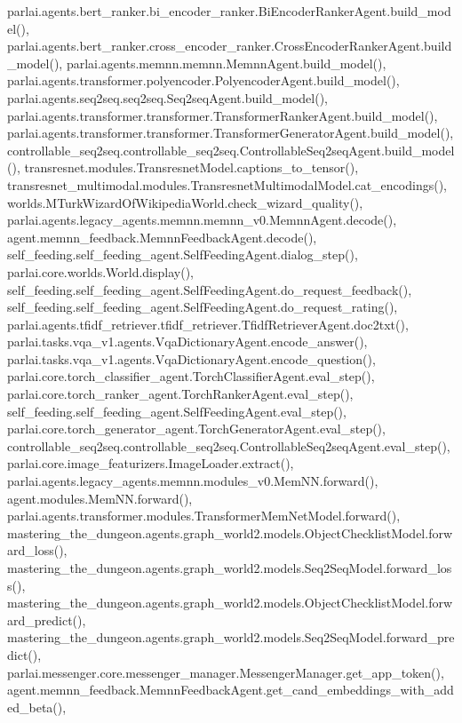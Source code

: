 parlai.\+agents.\+bert\+\_\+ranker.\+bi\+\_\+encoder\+\_\+ranker.\+Bi\+Encoder\+Ranker\+Agent.\+build\+\_\+model(), parlai.\+agents.\+bert\+\_\+ranker.\+cross\+\_\+encoder\+\_\+ranker.\+Cross\+Encoder\+Ranker\+Agent.\+build\+\_\+model(), parlai.\+agents.\+memnn.\+memnn.\+Memnn\+Agent.\+build\+\_\+model(), parlai.\+agents.\+transformer.\+polyencoder.\+Polyencoder\+Agent.\+build\+\_\+model(), parlai.\+agents.\+seq2seq.\+seq2seq.\+Seq2seq\+Agent.\+build\+\_\+model(), parlai.\+agents.\+transformer.\+transformer.\+Transformer\+Ranker\+Agent.\+build\+\_\+model(), parlai.\+agents.\+transformer.\+transformer.\+Transformer\+Generator\+Agent.\+build\+\_\+model(), controllable\+\_\+seq2seq.\+controllable\+\_\+seq2seq.\+Controllable\+Seq2seq\+Agent.\+build\+\_\+model(), transresnet.\+modules.\+Transresnet\+Model.\+captions\+\_\+to\+\_\+tensor(), transresnet\+\_\+multimodal.\+modules.\+Transresnet\+Multimodal\+Model.\+cat\+\_\+encodings(), worlds.\+M\+Turk\+Wizard\+Of\+Wikipedia\+World.\+check\+\_\+wizard\+\_\+quality(), parlai.\+agents.\+legacy\+\_\+agents.\+memnn.\+memnn\+\_\+v0.\+Memnn\+Agent.\+decode(), agent.\+memnn\+\_\+feedback.\+Memnn\+Feedback\+Agent.\+decode(), self\+\_\+feeding.\+self\+\_\+feeding\+\_\+agent.\+Self\+Feeding\+Agent.\+dialog\+\_\+step(), parlai.\+core.\+worlds.\+World.\+display(), self\+\_\+feeding.\+self\+\_\+feeding\+\_\+agent.\+Self\+Feeding\+Agent.\+do\+\_\+request\+\_\+feedback(), self\+\_\+feeding.\+self\+\_\+feeding\+\_\+agent.\+Self\+Feeding\+Agent.\+do\+\_\+request\+\_\+rating(), parlai.\+agents.\+tfidf\+\_\+retriever.\+tfidf\+\_\+retriever.\+Tfidf\+Retriever\+Agent.\+doc2txt(), parlai.\+tasks.\+vqa\+\_\+v1.\+agents.\+Vqa\+Dictionary\+Agent.\+encode\+\_\+answer(), parlai.\+tasks.\+vqa\+\_\+v1.\+agents.\+Vqa\+Dictionary\+Agent.\+encode\+\_\+question(), parlai.\+core.\+torch\+\_\+classifier\+\_\+agent.\+Torch\+Classifier\+Agent.\+eval\+\_\+step(), parlai.\+core.\+torch\+\_\+ranker\+\_\+agent.\+Torch\+Ranker\+Agent.\+eval\+\_\+step(), self\+\_\+feeding.\+self\+\_\+feeding\+\_\+agent.\+Self\+Feeding\+Agent.\+eval\+\_\+step(), parlai.\+core.\+torch\+\_\+generator\+\_\+agent.\+Torch\+Generator\+Agent.\+eval\+\_\+step(), controllable\+\_\+seq2seq.\+controllable\+\_\+seq2seq.\+Controllable\+Seq2seq\+Agent.\+eval\+\_\+step(), parlai.\+core.\+image\+\_\+featurizers.\+Image\+Loader.\+extract(), parlai.\+agents.\+legacy\+\_\+agents.\+memnn.\+modules\+\_\+v0.\+Mem\+N\+N.\+forward(), agent.\+modules.\+Mem\+N\+N.\+forward(), parlai.\+agents.\+transformer.\+modules.\+Transformer\+Mem\+Net\+Model.\+forward(), mastering\+\_\+the\+\_\+dungeon.\+agents.\+graph\+\_\+world2.\+models.\+Object\+Checklist\+Model.\+forward\+\_\+loss(), mastering\+\_\+the\+\_\+dungeon.\+agents.\+graph\+\_\+world2.\+models.\+Seq2\+Seq\+Model.\+forward\+\_\+loss(), mastering\+\_\+the\+\_\+dungeon.\+agents.\+graph\+\_\+world2.\+models.\+Object\+Checklist\+Model.\+forward\+\_\+predict(), mastering\+\_\+the\+\_\+dungeon.\+agents.\+graph\+\_\+world2.\+models.\+Seq2\+Seq\+Model.\+forward\+\_\+predict(), parlai.\+messenger.\+core.\+messenger\+\_\+manager.\+Messenger\+Manager.\+get\+\_\+app\+\_\+token(), agent.\+memnn\+\_\+feedback.\+Memnn\+Feedback\+Agent.\+get\+\_\+cand\+\_\+embeddings\+\_\+with\+\_\+added\+\_\+beta(), 